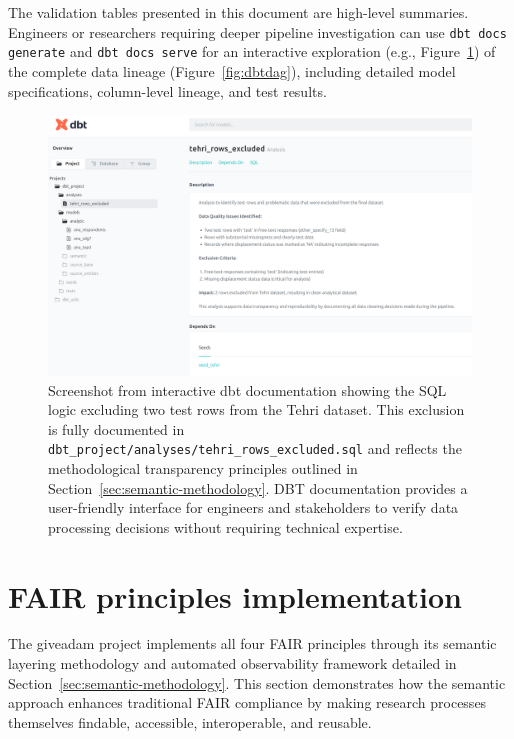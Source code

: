 \documentclass{article}
\begin{document}
The validation tables presented in this document are high-level summaries. Engineers or researchers requiring deeper pipeline investigation can use \texttt{dbt docs generate} and \texttt{dbt docs serve} for an interactive exploration (e.g., Figure~\ref{fig:tehri-exclusions}) of the complete data lineage (Figure~\ref{fig:dbtdag}), including detailed model specifications, column-level lineage, and test results. 

\begin{figure}[ht]
  \centering
  \includegraphics[width=\textwidth]{img/dbt-docs-tehri-exclusions.png}
  \caption{\label{fig:tehri-exclusions} Screenshot from interactive dbt documentation showing the SQL logic excluding two test rows from the Tehri dataset. This exclusion is fully documented in \texttt{dbt\_project/analyses/tehri\_rows\_excluded.sql} and reflects the methodological transparency principles outlined in Section~\ref{sec:semantic-methodology}. DBT documentation provides a user-friendly interface for engineers and stakeholders to verify data processing decisions without requiring technical expertise.}
\end{figure}

\section{FAIR principles implementation}
\label{sec:fair}

The giveadam project implements all four FAIR principles \cite{wilkinson2016fair} through its semantic layering methodology and automated observability framework detailed in Section~\ref{sec:semantic-methodology}. This section demonstrates how the semantic approach enhances traditional FAIR compliance by making research processes themselves findable, accessible, interoperable, and reusable.
\end{document}

